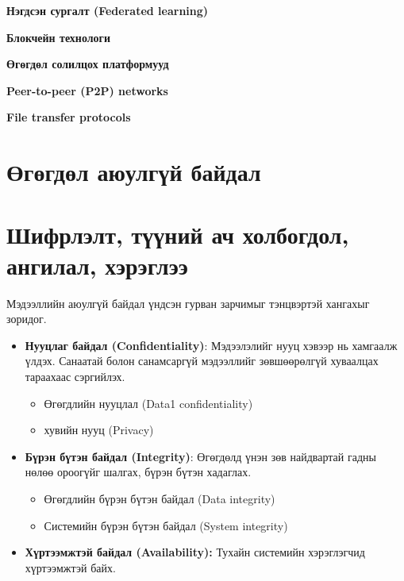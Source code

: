 \textbf{Нэгдсэн сургалт (Federated learning)}

\textbf{Блокчейн технологи}

\textbf{Өгөгдөл солилцох платформууд}

\textbf{Peer-to-peer (P2P) networks}

\textbf{File transfer protocols}


\section{Өгөгдөл аюулгүй байдал}



\section{Шифрлэлт, түүний ач холбогдол, ангилал, хэрэглээ}
Мэдээллийн аюулгүй байдал үндсэн гурван зарчимыг тэнцвэртэй хангахыг зоридог. 
\begin{itemize}
    \item \textbf{Нууцлаг байдал (Confidentiality)}: Мэдээлэлийг нууц хэвээр нь хамгаалж үлдэх. Санаатай болон санамсаргүй мэдээллийг зөвшөөрөлгүй хуваалцах тараахаас сэргийлэх.
    \begin{itemize}
        \item Өгөгдлийн нууцлал (Data1 confidentiality)
        \item хувийн нууц (Privacy)
    \end{itemize}
    \item \textbf{Бүрэн бүтэн байдал (Integrity)}: Өгөгдөлд үнэн зөв найдвартай гадны нөлөө ороогүйг шалгах, бүрэн бүтэн хадаглах. 
    \begin{itemize}
        \item Өгөгдлийн бүрэн бүтэн байдал (Data integrity)
        \item Системийн бүрэн бүтэн байдал (System integrity) 
    \end{itemize}
    \item \textbf{Хүртээмжтэй байдал (Availability):} Тухайн системийн хэрэглэгчид хүртээмжтэй байх.
\end{itemize}

